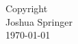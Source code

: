 \begin{center}
    \large
    \vspace*{\fill}
    Copyright\\
    Joshua Springer\\
    \specialdate\today
    \vspace*{\fill}
\end{center}
\newpage